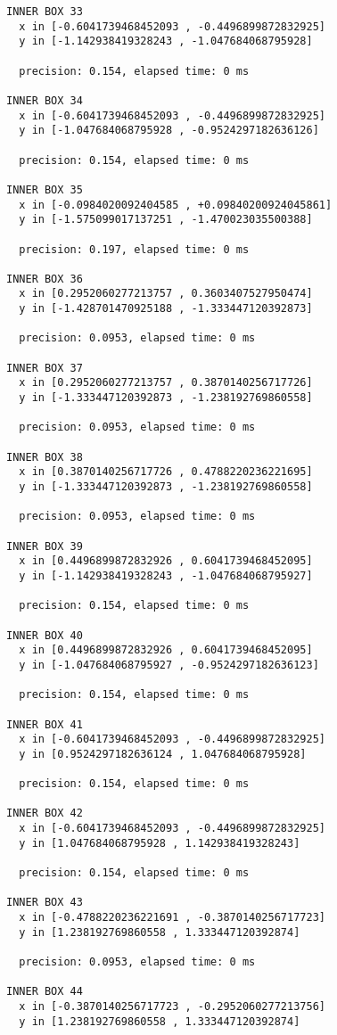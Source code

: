 \begin{verbatim}
INNER BOX 33
  x in [-0.6041739468452093 , -0.4496899872832925]
  y in [-1.142938419328243 , -1.047684068795928]

  precision: 0.154, elapsed time: 0 ms

INNER BOX 34
  x in [-0.6041739468452093 , -0.4496899872832925]
  y in [-1.047684068795928 , -0.9524297182636126]

  precision: 0.154, elapsed time: 0 ms

INNER BOX 35
  x in [-0.0984020092404585 , +0.09840200924045861]
  y in [-1.575099017137251 , -1.470023035500388]

  precision: 0.197, elapsed time: 0 ms

INNER BOX 36
  x in [0.2952060277213757 , 0.3603407527950474]
  y in [-1.428701470925188 , -1.333447120392873]

  precision: 0.0953, elapsed time: 0 ms

INNER BOX 37
  x in [0.2952060277213757 , 0.3870140256717726]
  y in [-1.333447120392873 , -1.238192769860558]

  precision: 0.0953, elapsed time: 0 ms

INNER BOX 38
  x in [0.3870140256717726 , 0.4788220236221695]
  y in [-1.333447120392873 , -1.238192769860558]

  precision: 0.0953, elapsed time: 0 ms

INNER BOX 39
  x in [0.4496899872832926 , 0.6041739468452095]
  y in [-1.142938419328243 , -1.047684068795927]

  precision: 0.154, elapsed time: 0 ms

INNER BOX 40
  x in [0.4496899872832926 , 0.6041739468452095]
  y in [-1.047684068795927 , -0.9524297182636123]

  precision: 0.154, elapsed time: 0 ms

INNER BOX 41
  x in [-0.6041739468452093 , -0.4496899872832925]
  y in [0.9524297182636124 , 1.047684068795928]

  precision: 0.154, elapsed time: 0 ms

INNER BOX 42
  x in [-0.6041739468452093 , -0.4496899872832925]
  y in [1.047684068795928 , 1.142938419328243]

  precision: 0.154, elapsed time: 0 ms

INNER BOX 43
  x in [-0.4788220236221691 , -0.3870140256717723]
  y in [1.238192769860558 , 1.333447120392874]

  precision: 0.0953, elapsed time: 0 ms

INNER BOX 44
  x in [-0.3870140256717723 , -0.2952060277213756]
  y in [1.238192769860558 , 1.333447120392874]


\end{verbatim}
